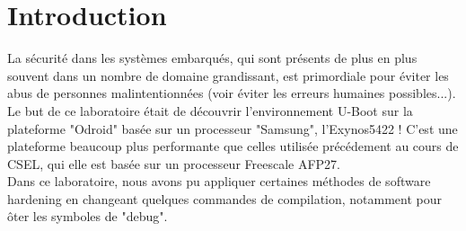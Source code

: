 
\chapter{Introduction} %

\label{Chapitre 1} %


La sécurité dans les systèmes embarqués, qui sont présents de plus en plus souvent dans un nombre de domaine grandissant, est primordiale pour éviter les abus de personnes malintentionnées (voir éviter les erreurs humaines possibles...). \\

 Le but de ce laboratoire était de découvrir l'environnement U-Boot sur la plateforme "Odroid" basée sur un processeur "Samsung", l'Exynos5422 ! C'est une plateforme beaucoup plus performante que celles utilisée précédement au cours de CSEL, qui elle est basée sur un processeur Freescale AFP27. \\ 

Dans ce laboratoire, nous avons pu appliquer certaines méthodes de software hardening en changeant quelques commandes de compilation, notamment pour ôter les symboles de "debug".


























